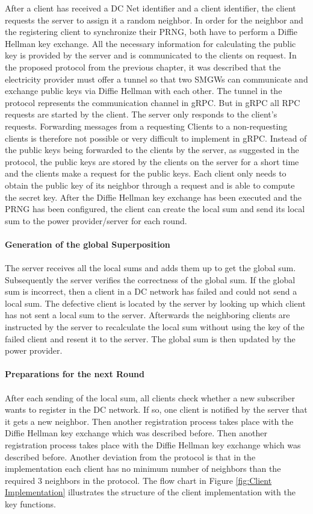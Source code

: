 After a client has received a DC Net identifier and a client identifier, the client requests the server to assign it a random neighbor. In order for the neighbor and the registering client to synchronize their PRNG, both have to perform a Diffie Hellman key exchange. All the necessary information for calculating the public key is provided by the server and is communicated to the clients on request. In the proposed protocol from the previous chapter, it was described that the electricity provider must offer a tunnel so that two SMGWs can communicate and exchange public keys via Diffie Hellman with each other. The tunnel in the protocol represents the communication channel in gRPC. But in gRPC all RPC requests are started by the client. The server only responds to the client's requests. Forwarding messages from a requesting Clients to a non-requesting clients is therefore not possible or very difficult to implement in gRPC. Instead of the public keys being forwarded to the clients by the server, as suggested in the protocol, the public keys are stored by the clients on the server for a short time and the clients make a request for the public keys. 
Each client only needs to obtain the public key of its neighbor through a request and is able to compute the secret key. After the Diffie Hellman key exchange has been executed and the PRNG has been configured, the client can create the local sum and send its local sum to the power provider/server for each round. 
\\
\\
\textbf{Generation of the global Superposition}
\\
\\
The server receives all the local sums and adds them up to get the global sum. Subsequently the server verifies the correctness of the global sum. If the global sum is incorrect, then a client in a DC network has failed and could not send a local sum. The defective client is located by the server by looking up which client has not sent a local sum to the server. Afterwards the neighboring clients are instructed by the server to recalculate the local sum without using the key of the failed client and resent it to the server. The global sum is then updated by the power provider. \\
\\
\textbf{Preparations for the next Round}
\\
\\
After each sending of the local sum, all clients check whether a new subscriber wants to register in the DC network. If so, one client is notified by the server that it gets a new neighbor. Then another registration process takes place with the Diffie Hellman key exchange which was described before. Then another registration process takes place with the Diffie Hellman key exchange which was described before. Another deviation from the protocol is that in the implementation each client has no minimum number of neighbors than the required 3 neighbors in the protocol. The flow chart in Figure \ref{fig:Client Implementation} illustrates the structure of the client implementation with the key functions.
